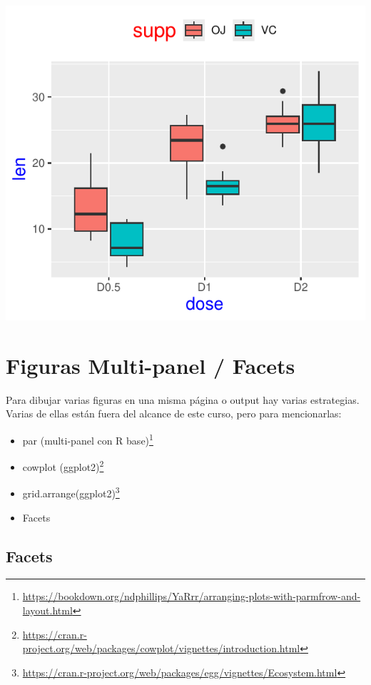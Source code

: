\documentclass[
]{book}
\begin{document}
\begin{center}\includegraphics{R_Manual_files/figure-latex/unnamed-chunk-219-1} \end{center}

\section{Figuras Multi-panel / Facets}\label{figuras-multi-panel-facets}

Para dibujar varias figuras en una misma página o output hay varias estrategias.
Varias de ellas están fuera del alcance de este curso, pero para mencionarlas:

\begin{itemize}
\item
  par (multi-panel con R base)\footnote{\url{https://bookdown.org/ndphillips/YaRrr/arranging-plots-with-parmfrow-and-layout.html}}
\item
  cowplot (ggplot2)\footnote{\url{https://cran.r-project.org/web/packages/cowplot/vignettes/introduction.html}}
\item
  grid.arrange(ggplot2)\footnote{\url{https://cran.r-project.org/web/packages/egg/vignettes/Ecosystem.html}}
\item
  Facets
\end{itemize}

\subsection{Facets}\label{facets}
\end{document}
